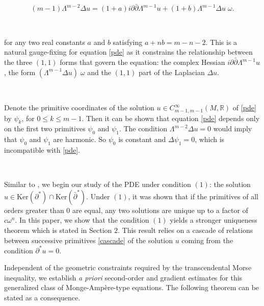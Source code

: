 \documentclass[11pt,letterpaper]{amsart}
\newcommand{\spartial}{\partial^*}
\newcommand{\pbp}{\partial \bar{\partial}}
\newcommand{\Ker}{\mbox{Ker}}
\numberwithin{equation}{section}
\begin{document}
\begin{equation}\label{gen-IC}
    (m-1)\Lambda^{m-2} \Delta u = (1+a) i \pbp \Lambda^{m-1}  u +  (1+b) \Lambda^{m-1} \Delta u \;\omega.
\end{equation} 

\

\noindent for any two real constants $a$ and $b$ satisfying $a + nb = m-n-2$. This is a natural gauge-fixing for equation \eqref{pde} as it constrains the relationship between the three $(1,1)$ forms that govern the equation: the complex Hessian $i \pbp \Lambda^{m-1}u$, the form $(\Lambda^{m-1} \Delta u) \; \omega$ and the $(1,1)$ part of the Laplacian $\Delta u$.

\

 Denote the primitive coordinates of the solution $u \in C^{\infty}_{m-1,m-1}(M, \mathbb R)$ of \eqref{pde} by $\psi_k$, for $0 \leq k \leq m-1$. Then it can be shown that equation \eqref{pde} depends only on the first two primitives $\psi_0$ and $\psi_1$. The condition $\Lambda^{m-2} \Delta u = 0$ would imply that $\psi_0$ and $\psi_1$ are harmonic. So $\psi_0$ is constant and $\Delta \psi_1 = 0$, which is incompatible with \eqref{pde}.

 \


Similar to \cite{DP25}, we begin our study of the PDE under condition $(1)$: the solution $u \in \Ker (\spartial) \cap \Ker( \bar{\partial}^*)$. Under $(1)$, it was shown that if the primitives of all orders greater than $0$ are equal, any two solutions are unique up to a factor of $c \omega^n$. In this paper, we show that the condition $(1)$ yields a stronger uniqueness theorem which is stated in Section $2$. This result relies on a cascade of relations between successive primitives  \eqref{cascade} of the solution $u$ coming from the condition $\partial^* u = 0$.






Independent of the geometric constraints required by the transcendental Morse inequality, we establish \emph{a priori} second-order and gradient estimates for this generalized class of Monge-Amp\`ere-type equations. The following theorem can be stated as a consequence. 
\end{document}

